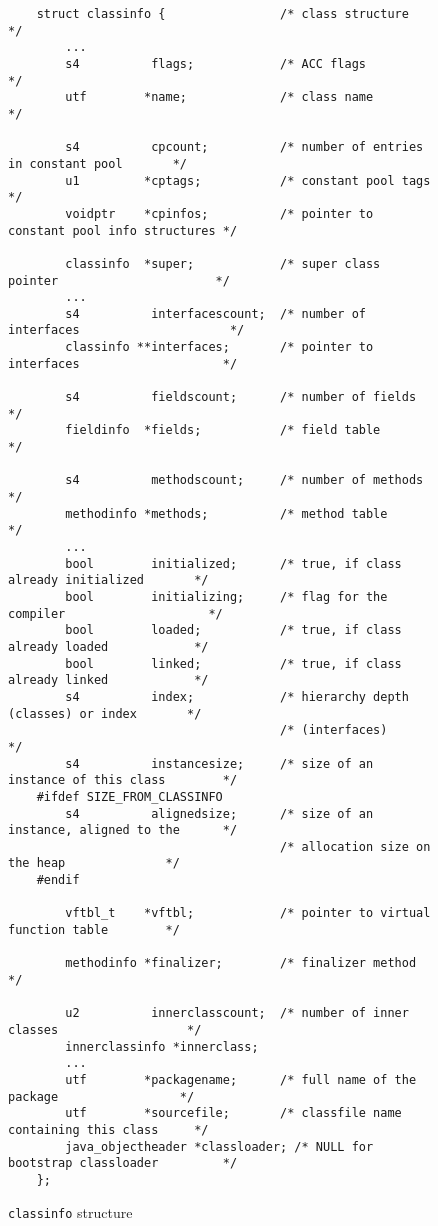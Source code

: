 \begin{figure}
\begin{verbatim}
    struct classinfo {                /* class structure                          */
        ...
        s4          flags;            /* ACC flags                                */
        utf        *name;             /* class name                               */

        s4          cpcount;          /* number of entries in constant pool       */
        u1         *cptags;           /* constant pool tags                       */
        voidptr    *cpinfos;          /* pointer to constant pool info structures */

        classinfo  *super;            /* super class pointer                      */
        ...
        s4          interfacescount;  /* number of interfaces                     */
        classinfo **interfaces;       /* pointer to interfaces                    */

        s4          fieldscount;      /* number of fields                         */
        fieldinfo  *fields;           /* field table                              */

        s4          methodscount;     /* number of methods                        */
        methodinfo *methods;          /* method table                             */
        ...
        bool        initialized;      /* true, if class already initialized       */
        bool        initializing;     /* flag for the compiler                    */
        bool        loaded;           /* true, if class already loaded            */
        bool        linked;           /* true, if class already linked            */
        s4          index;            /* hierarchy depth (classes) or index       */
                                      /* (interfaces)                             */
        s4          instancesize;     /* size of an instance of this class        */
    #ifdef SIZE_FROM_CLASSINFO
        s4          alignedsize;      /* size of an instance, aligned to the      */
                                      /* allocation size on the heap              */
    #endif

        vftbl_t    *vftbl;            /* pointer to virtual function table        */

        methodinfo *finalizer;        /* finalizer method                         */

        u2          innerclasscount;  /* number of inner classes                  */
        innerclassinfo *innerclass;
        ...
        utf        *packagename;      /* full name of the package                 */
        utf        *sourcefile;       /* classfile name containing this class     */
        java_objectheader *classloader; /* NULL for bootstrap classloader         */
    };
\end{verbatim}
\caption{\texttt{classinfo} structure}
\label{classinfostructure}
\end{figure}

